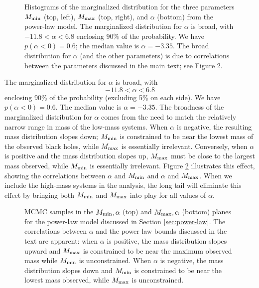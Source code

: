 \documentclass[preprint]{aastex}
\newcommand{\Mmin}{M_{\textnormal{min}}}
\newcommand{\Mmax}{M_{\textnormal{max}}}
\begin{document}
\begin{figure}
  \begin{center}
  \end{center}
  \caption{\label{fig:power-law} Histograms of the marginalized
    distribution for the three parameters $\Mmin$ (top, left), $\Mmax$
    (top, right), and $\alpha$ (bottom) from the power-law model.  The
    marginalized distribution for $\alpha$ is broad, with $-11.8 <
    \alpha < 6.8$ enclosing 90\% of the probability.  We have
    $p(\alpha < 0) = 0.6$; the median value is $\alpha = -3.35$.  The
    broad distribution for $\alpha$ (and the other parameters) is due
    to correlations between the parameters discussed in the main text;
    see Figure \ref{fig:power-law-2D}.}
\end{figure}

The marginalized distribution for $\alpha$ is broad, with
\begin{equation}
  -11.8 < \alpha < 6.8
\end{equation}
enclosing 90\% of the probability (excluding 5\% on each side).  We
have $p(\alpha < 0) = 0.6$.  The median value is $\alpha = -3.35$.
The broadness of the marginalized distribution for $\alpha$ comes from
the need to match the relatively narrow range in mass of the
low-mass systems.  When $\alpha$ is negative, the resulting mass
distribution slopes down; $\Mmin$ is constrained to be near the lowest
mass of the observed black holes, while $\Mmax$ is essentially
irrelevant.  Conversely, when $\alpha$ is positive and the mass
distribution slopes up, $\Mmax$ must be close to the largest mass
observed, while $\Mmin$ is essentially irrelevant.  Figure
\ref{fig:power-law-2D} illustrates this effect, showing the
correlations between $\alpha$ and $\Mmin$ and $\alpha$ and $\Mmax$.
When we include the high-mass systems in the analysis, the long tail
will eliminate this effect by bringing both $\Mmin$ and $\Mmax$ into
play for all values of $\alpha$.

\begin{figure}
  \begin{center}
  \end{center}
  \caption{\label{fig:power-law-2D} MCMC samples in the $\Mmin,
    \alpha$ (top) and $\Mmax, \alpha$ (bottom) planes for the
    power-law model discussed in Section \ref{sec:power-law}.  The
    correlations between $\alpha$ and the power law bounds discussed
    in the text are apparent: when $\alpha$ is positive, the mass
    distribution slopes upward and $\Mmax$ is constrained to be near
    the maximum observed mass while $\Mmin$ is unconstrained.  When
    $\alpha$ is negative, the mass distribution slopes down and
    $\Mmin$ is constrained to be near the lowest mass observed, while
    $\Mmax$ is unconstrained. }
\end{figure}
\end{document}

